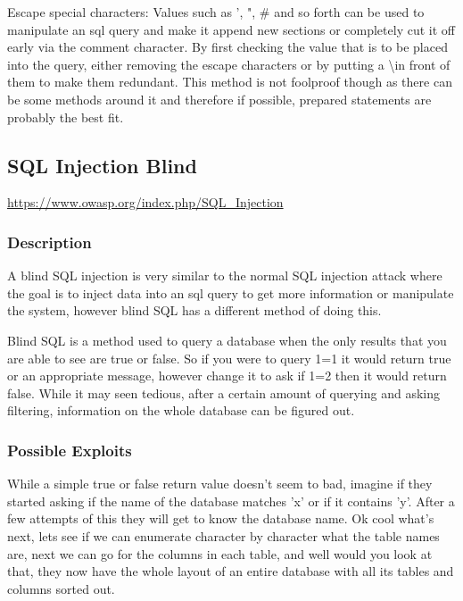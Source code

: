 \documentclass[titlepage]{article}
\begin{document}
      Escape special characters: Values such as ', ", \# and so forth can be used to manipulate an sql query and make it append new sections or completely cut it off early via the comment character. By first checking the value that is to be placed into the query, either removing the escape characters or by putting a \textbackslash in front of them to make them redundant. This method is not foolproof though as there can be some methods around it and therefore if possible, prepared statements are probably the best fit.



   \subsection{SQL Injection Blind} %
   \label{sub:sql_injection_blind}

      \url{https://www.owasp.org/index.php/SQL_Injection}
   
      \subsubsection{Description} %
      \label{ssub:sql_injection_blind_description}
      
      A blind SQL injection is very similar to the normal SQL injection attack where the goal is to inject data into an sql query to get more information or manipulate the system, however blind SQL has a different method of doing this. 

      Blind SQL is a method used to query a database when the only results that you are able to see are true or false. So if you were to query 1=1 it would return true or an appropriate message, however change it to ask if 1=2 then it would return false. While it may seen tedious, after a certain amount of querying and asking filtering, information on the whole database can be figured out.   


      \subsubsection{Possible Exploits} %
      \label{ssub:sql_injection_blind_possible_exploits}
      
      While a simple true or false return value doesn't seem to bad, imagine if they started asking if the name of the database matches 'x' or if it contains 'y'. After a few attempts of this they will get to know the database name. Ok cool what's next, lets see if we can enumerate character by character what the table names are, next we can go for the columns in each table, and well would you look at that, they now have the whole layout of an entire database with all its tables and columns sorted out. 
\end{document}
